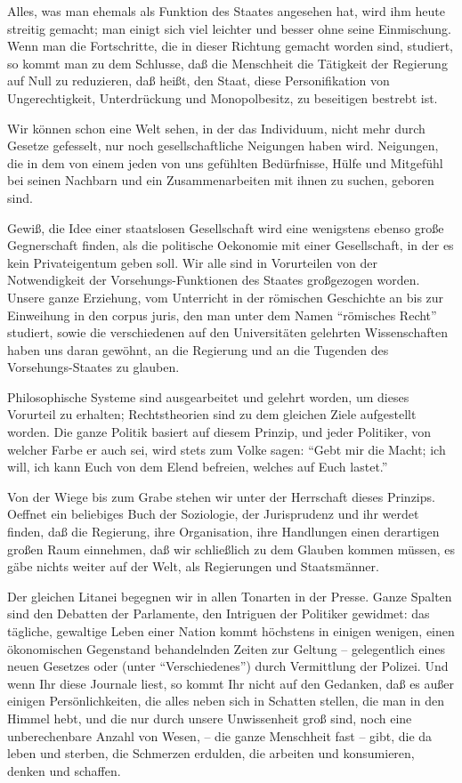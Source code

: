 \documentclass{scrbook}
\begin{document}
Alles, was man ehemals als Funktion des Staates angesehen hat, wird ihm heute streitig gemacht; man einigt sich viel leichter und besser ohne seine Einmischung. Wenn man die Fortschritte, die in dieser Richtung gemacht worden sind, studiert, so kommt man zu dem Schlusse, daß die Menschheit die Tätigkeit der Regierung auf Null zu reduzieren, daß heißt, den Staat, diese Personifikation von Ungerechtigkeit, Unterdrückung und Monopolbesitz, zu beseitigen bestrebt ist.

Wir können schon eine Welt sehen, in der das Individuum, nicht mehr durch Gesetze gefesselt, nur noch gesellschaftliche Neigungen haben wird. Neigungen, die in dem von einem jeden von uns gefühlten Bedürfnisse, Hülfe und Mitgefühl bei seinen Nachbarn und ein Zusammenarbeiten mit ihnen zu suchen, geboren sind.

Gewiß, die Idee einer staatslosen Gesellschaft wird eine wenigstens ebenso große Gegnerschaft finden, als die politische Oekonomie mit einer Gesellschaft, in der es kein Privateigentum geben soll. Wir alle sind in Vorurteilen von der Notwendigkeit der Vorsehungs-Funktionen des Staates großgezogen worden. Unsere ganze Erziehung, vom Unterricht in der römischen Geschichte an bis zur Einweihung in den corpus juris, den man unter dem Namen ``römisches Recht'' studiert, sowie die verschiedenen auf den Universitäten gelehrten Wissenschaften haben uns daran gewöhnt, an die Regierung und an die Tugenden des Vorsehungs-Staates zu glauben.

Philosophische Systeme sind ausgearbeitet und gelehrt worden, um dieses Vorurteil zu erhalten; Rechtstheorien sind zu dem gleichen Ziele aufgestellt worden. Die ganze Politik basiert auf diesem Prinzip, und jeder Politiker, von welcher Farbe er auch sei, wird stets zum Volke sagen: ``Gebt mir die Macht; ich will, ich kann Euch von dem Elend befreien, welches auf Euch lastet.''

Von der Wiege bis zum Grabe stehen wir unter der Herrschaft dieses Prinzips. Oeffnet ein beliebiges Buch der Soziologie, der Jurisprudenz und ihr werdet finden, daß die Regierung, ihre Organisation, ihre Handlungen einen derartigen großen Raum einnehmen, daß wir schließlich zu dem Glauben kommen müssen, es gäbe nichts weiter auf der Welt, als Regierungen und Staatsmänner.

Der gleichen Litanei begegnen wir in allen Tonarten in der Presse. Ganze Spalten sind den Debatten der Parlamente, den Intriguen der Politiker gewidmet: das tägliche, gewaltige Leben einer Nation kommt höchstens in einigen wenigen, einen ökonomischen Gegenstand behandelnden Zeiten zur Geltung – gelegentlich eines neuen Gesetzes oder (unter ``Verschiedenes'') durch Vermittlung der Polizei. Und wenn Ihr diese Journale liest, so kommt Ihr nicht auf den Gedanken, daß es außer einigen Persönlichkeiten, die alles neben sich in Schatten stellen, die man in den Himmel hebt, und die nur durch unsere Unwissenheit groß sind, noch eine unberechenbare Anzahl von Wesen, – die ganze Menschheit fast – gibt, die da leben und sterben, die Schmerzen erdulden, die arbeiten und konsumieren, denken und schaffen.
\end{document}
